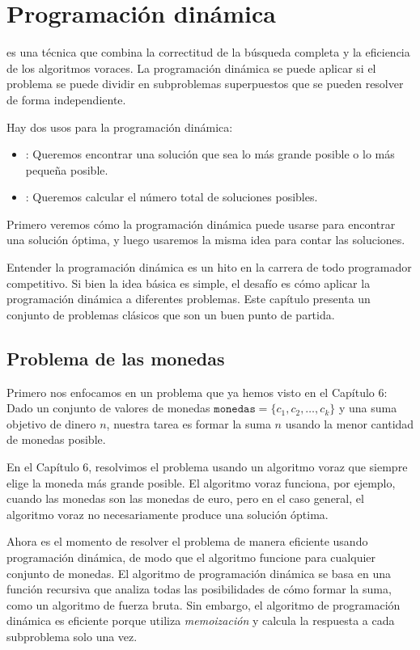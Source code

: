 \chapter{Programación dinámica}


es una técnica que combina la correctitud
de la búsqueda completa y la eficiencia
de los algoritmos voraces.
La programación dinámica se puede aplicar si el
problema se puede dividir en subproblemas superpuestos
que se pueden resolver de forma independiente.

Hay dos usos para la programación dinámica:

\begin{itemize}
\item
{}:
Queremos encontrar una solución que sea
lo más grande posible o lo más pequeña posible.
\item
{}:
Queremos calcular el número total de
soluciones posibles.
\end{itemize}

Primero veremos cómo la programación dinámica puede
usarse para encontrar una solución óptima,
y luego usaremos la misma idea para
contar las soluciones.

Entender la programación dinámica es un hito
en la carrera de todo programador competitivo.
Si bien la idea básica es simple,
el desafío es cómo aplicar
la programación dinámica a diferentes problemas.
Este capítulo presenta un conjunto de problemas clásicos
que son un buen punto de partida.

\section{Problema de las monedas}

Primero nos enfocamos en un problema que ya
hemos visto en el Capítulo 6:
Dado un conjunto de valores de monedas $\texttt{monedas} = \{c_1,c_2,\ldots,c_k\}$
y una suma objetivo de dinero $n$, nuestra tarea es
formar la suma $n$ usando la menor cantidad de monedas posible.

En el Capítulo 6, resolvimos el problema usando un
algoritmo voraz que siempre elige la moneda
más grande posible.
El algoritmo voraz funciona, por ejemplo,
cuando las monedas son las monedas de euro,
pero en el caso general, el algoritmo voraz
no necesariamente produce una solución óptima.

Ahora es el momento de resolver el problema de manera eficiente
usando programación dinámica, de modo que el algoritmo
funcione para cualquier conjunto de monedas.
El algoritmo de programación dinámica
se basa en una función recursiva
que analiza todas las posibilidades de cómo
formar la suma, como un algoritmo de fuerza bruta.
Sin embargo, el algoritmo de programación dinámica
es eficiente porque
utiliza \emph{memoización} y
calcula la respuesta a cada subproblema solo una vez.

